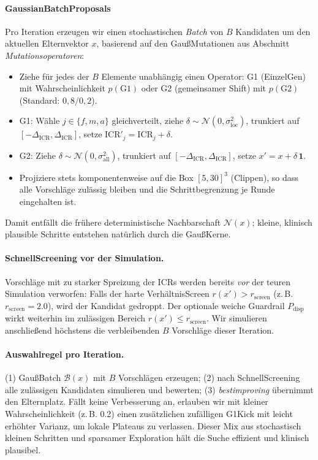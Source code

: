 \documentclass[ngerman,a4paper,12pt,pdftex]{article}
\newcommand{\ICR}{\mathrm{ICR}}
\begin{document}
\paragraph{Gaussian\-Batch\-Proposals}
Pro Iteration erzeugen wir einen stochastischen \emph{Batch} von $B$ Kandidaten um den aktuellen Elternvektor $x$, basierend auf den Gau{\ss}\-Mutationen aus Abschnitt \emph{Mutationsoperatoren}:
\begin{itemize}
  \item Ziehe f\"ur jedes der $B$ Elemente unabh\"angig einen Operator: G1 (Einzel\-Gen) mit Wahrscheinlichkeit $p(\mathrm{G1})$ oder G2 (gemeinsamer Shift) mit $p(\mathrm{G2})$ (Standard: $0{,}8/0{,}2$).
  \item G1: W\"ahle $j\in\{f,m,a\}$ gleichverteilt, ziehe $\delta\sim\mathcal N(0,\sigma_{\text{loc}}^2)$, trunkiert auf $[-\Delta_{\mathrm{ICR}},\Delta_{\mathrm{ICR}}]$, setze $\ICR'_j=\ICR_j+\delta$.
  \item G2: Ziehe $\delta\sim\mathcal N(0,\sigma_{\text{all}}^2)$, trunkiert auf $[-\Delta_{\mathrm{ICR}},\Delta_{\mathrm{ICR}}]$, setze $x'=x+\delta\,\mathbf 1$.
  \item Projiziere stets komponentenweise auf die Box $[5,30]^3$ (Clippen), so dass alle Vorschl\"age zul\"assig bleiben und die Schrittbegrenzung je Runde eingehalten ist.
\end{itemize}
Damit entf\"allt die fr\"uhere deterministische Nachbarschaft $\mathcal N(x)$; kleine, klinisch plausible Schritte entstehen nat\"urlich durch die Gau{\ss}\-Kerne.

\paragraph{Schnell\-Screening vor der Simulation.}
Vorschl\"age mit zu starker Spreizung der ICRs werden bereits \emph{vor} der teuren Simulation verworfen: Falls der harte Verh\"altnis\-Screen $r(x')>r_{\text{screen}}$ (z.\,B. $r_{\text{screen}}=2.0$), wird der Kandidat gedroppt. Der optionale weiche Guardrail $P_{\mathrm{disp}}$ wirkt weiterhin im zul\"assigen Bereich $r(x')\le r_{\text{screen}}$. Wir simulieren anschlie\ss end h\"ochstens die verbleibenden $B$ Vorschl\"age dieser Iteration.

\paragraph{Auswahlregel pro Iteration.}
(1) Gau{\ss}\-Batch $\mathcal B(x)$ mit $B$ Vorschl\"agen erzeugen; (2) nach Schnell\-Screening alle zul\"assigen Kandidaten simulieren und bewerten; (3) \emph{best\-improving} \"ubernimmt den Elternplatz. F\"allt keine Verbesserung an, erlauben wir mit kleiner Wahrscheinlichkeit (z.\,B. 0.2) einen zus\"atzlichen zuf\"alligen G1\-Kick mit leicht erh\"ohter Varianz, um lokale Plateaus zu verlassen. Dieser Mix aus stochastisch kleinen Schritten und sparsamer Exploration h\"alt die Suche effizient und klinisch plausibel.
\end{document}
